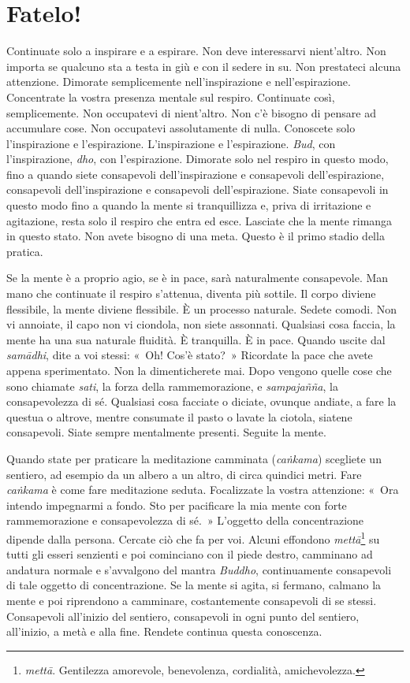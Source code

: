 \chapter{Fatelo!}

Continuate solo a inspirare e a espirare. Non deve interessarvi
nient'altro. Non importa se qualcuno sta a testa in giù e con il sedere
in su. Non prestateci alcuna attenzione. Dimorate semplicemente
nell'inspirazione e nell'espirazione. Concentrate la vostra presenza
mentale sul respiro. Continuate così, semplicemente. Non occupatevi di
nient'altro. Non c'è bisogno di pensare ad accumulare cose. Non
occupatevi assolutamente di nulla. Conoscete solo l'inspirazione e
l'espirazione. L'inspirazione e l'espirazione. \emph{Bud}, con
l'inspirazione, \emph{dho}, con l'espirazione. Dimorate solo nel respiro
in questo modo, fino a quando siete consapevoli dell'inspirazione e
consapevoli dell'espirazione, consapevoli dell'inspirazione e
consapevoli dell'espirazione. Siate consapevoli in questo modo fino a
quando la mente si tranquillizza e, priva di irritazione e agitazione,
resta solo il respiro che entra ed esce. Lasciate che la mente rimanga
in questo stato. Non avete bisogno di una meta. Questo è il primo stadio
della pratica.

Se la mente è a proprio agio, se è in pace, sarà naturalmente
consapevole. Man mano che continuate il respiro s'attenua, diventa più
sottile. Il corpo diviene flessibile, la mente diviene flessibile. È un
processo naturale. Sedete comodi. Non vi annoiate, il capo non vi
ciondola, non siete assonnati. Qualsiasi cosa faccia, la mente ha una
sua naturale fluidità. È tranquilla. È in pace. Quando uscite dal
\emph{samādhi}, dite a voi stessi: «~Oh! Cos'è stato?~» Ricordate la
pace che avete appena sperimentato. Non la dimenticherete mai. Dopo
vengono quelle cose che sono chiamate \emph{sati}, la forza della
rammemorazione, e \emph{sampajañña}, la consapevolezza di sé. Qualsiasi
cosa facciate o diciate, ovunque andiate, a fare la questua o altrove,
mentre consumate il pasto o lavate la ciotola, siatene consapevoli.
Siate sempre mentalmente presenti. Seguite la mente.

Quando state per praticare la meditazione camminata (\emph{caṅkama})
scegliete un sentiero, ad esempio da un albero a un altro, di circa
quindici metri. Fare \emph{caṅkama} è come fare meditazione seduta.
Focalizzate la vostra attenzione: «~Ora intendo impegnarmi a fondo. Sto
per pacificare la mia mente con forte rammemorazione e consapevolezza di
sé.~» L'oggetto della concentrazione dipende dalla persona. Cercate ciò
che fa per voi. Alcuni effondono \emph{mettā}\footnote{\emph{mettā}.
  Gentilezza amorevole, benevolenza, cordialità, amichevolezza.} su
tutti gli esseri senzienti e poi cominciano con il piede destro,
camminano ad andatura normale e s'avvalgono del mantra \emph{Buddho},
continuamente consapevoli di tale oggetto di concentrazione. Se la mente
si agita, si fermano, calmano la mente e poi riprendono a camminare,
costantemente consapevoli di se stessi. Consapevoli all'inizio del
sentiero, consapevoli in ogni punto del sentiero, all'inizio, a metà e
alla fine. Rendete continua questa conoscenza.

